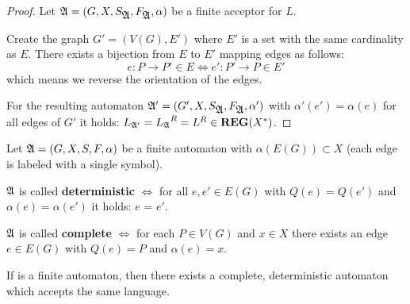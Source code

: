 \begin{proof}
Let $\mbox{$\mathfrak{A}$} = (G, X, S_{\mbox{$\mathfrak{A}$}}, F_{\mbox{$\mathfrak{A}$}}, \alpha)$ be a
finite acceptor for $L$.

Create the graph $G' = (V(G), E')$ where $E'$ is a set with the same cardinality
as $E$. There exists a bijection from $E$ to $E'$ mapping edges as follows:
\[ e : P \to P' \in E \Leftrightarrow e' : P' \to P \in E' \]
which means we reverse the orientation of the edges.

For the resulting automaton $\mbox{$\mathfrak{A'}$} = (G', X, S_{\mbox{$\mathfrak{A}$}},
F_{\mbox{$\mathfrak{A}$}}, \alpha')$ with $\alpha'(e') = \alpha(e)$ for all edges of $G'$
it holds: $\mbox{$L_{\mathfrak{A'}}$} = \mbox{$L_{\mathfrak{A}}$}^R = L^R \in \mbox{{\bf REG}}(X^*)$.
\end{proof}

\bigskip
\begin{definition}
Let $\mbox{$\mathfrak{A}$} = (G, X, S, F, \alpha)$ be a finite automaton with
$\alpha(E(G)) \subset X$ (each edge is labeled with a single
symbol).

$\mbox{$\mathfrak{A}$}$ is called {\bf deterministic} $\Leftrightarrow$ for all $e, e'
\in E(G)$ with $Q(e) = Q(e')$ and $\alpha(e) = \alpha(e')$ it holds: $e$ = $e'$.

$\mbox{$\mathfrak{A}$}$ is called {\bf complete} $\Leftrightarrow$ for each $P \in V(G)$
and $x \in X$ there exists an edge $e \in E(G)$ with $Q(e) = P$ and $\alpha(e)
= x$.
\end{definition}

\begin{theorem}
If  is a finite automaton, then there exists a complete,
deterministic automaton  which accepts the same language.
\end{theorem}

